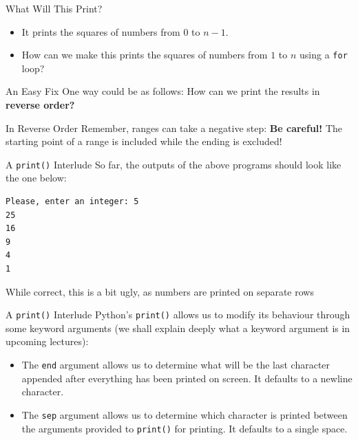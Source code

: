\documentclass[aspectratio=169, 12pt, xcolor=table]{beamer}
\begin{document}
	\begin{frame}{What Will This Print?}
		\pause
		\begin{itemize}
			\item It prints the squares of numbers from $0$ to $n-1$.\pause
			\item How can we make this prints the squares of numbers from $1$ to $n$ using a \texttt{for} loop?
		\end{itemize}
	\end{frame}

	\begin{frame}{An Easy Fix}
		One way could be as follows:
		\pause
		How can we print the results in \textbf{reverse order?}
	\end{frame}

	\begin{frame}{In Reverse Order}
		Remember, ranges can take a negative step:
		\pause
		\textbf{Be careful!} The starting point of a range is included while the ending is excluded!
	\end{frame}

	\begin{frame}[fragile]{A \texttt{print()} Interlude}
		So far, the outputs of the above programs should look like the one below:
		\begin{verbatim}
Please, enter an integer: 5
25
16
9
4
1
\end{verbatim}
		While correct, this is a bit ugly, as numbers are printed on separate rows
	\end{frame}

	\begin{frame}{A \texttt{print()} Interlude}
		Python's \texttt{print()} allows us to modify its behaviour through some keyword arguments (we shall explain deeply what a keyword argument is in upcoming lectures):
		\begin{itemize}
			\item The \texttt{end} argument allows us to determine what will be the last character appended after everything has been printed on screen. It defaults to a newline character.
			\item The \texttt{sep} argument allows us to determine which character is printed between the arguments provided to \texttt{print()} for printing. It defaults to a single space.
		\end{itemize}
	\end{frame}
\end{document}
